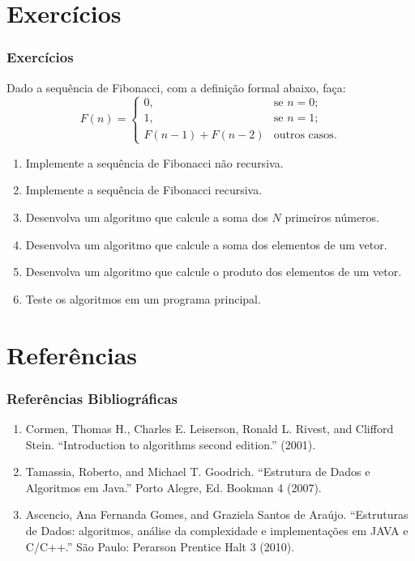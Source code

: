 \documentclass{beamer}
\begin{document}
\section{Exercícios}

\begin{frame}
    \frametitle{Exercícios}
    Dado a sequência de Fibonacci, com a definição formal abaixo, faça:
    \[
        F(n) =
        \begin{cases}
            0, & \text{se } n = 0; \\
            1, & \text{se } n = 1; \\
            F(n - 1) + F(n - 2) & \text{outros casos}.
        \end{cases}
    \]
    \begin{enumerate}
        \item Implemente a sequência de Fibonacci não recursiva.
        \item Implemente a sequência de Fibonacci recursiva.
        \item Desenvolva um algoritmo que calcule a soma dos $N$ primeiros números.
        \item Desenvolva um algoritmo que calcule a soma dos elementos de um vetor.
        \item Desenvolva um algoritmo que calcule o produto dos elementos de um vetor.
        \item Teste os algoritmos em um programa principal.
    \end{enumerate}
\end{frame}

\section{Referências}

\begin{frame}
    \frametitle{Referências Bibliográficas}
    \begin{enumerate}
        \item Cormen, Thomas H., Charles E. Leiserson, Ronald L. Rivest, and Clifford Stein. ``Introduction to algorithms second edition.'' (2001).
        \item Tamassia, Roberto, and Michael T. Goodrich. ``Estrutura de Dados e Algoritmos em Java.'' Porto Alegre, Ed. Bookman 4 (2007).
        \item Ascencio, Ana Fernanda Gomes, and Graziela Santos de Araújo. ``Estruturas de Dados: algoritmos, análise da complexidade e implementações em JAVA e C/C++.'' São Paulo: Perarson Prentice Halt 3 (2010).
    \end{enumerate}
\end{frame}
\end{document}

